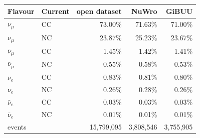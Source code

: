 \begin{tabular}{llrrr}
\toprule
Flavour & Current & open dataset & NuWro & GiBUU \\
\midrule
$\nu_\mu$ & CC & 73.00\% & 71.63\% & 71.00\% \\
$\nu_\mu$ & NC & 23.87\% & 25.23\% & 23.67\% \\
$\bar\nu_\mu$ & CC & 1.45\% & 1.42\% & 1.41\% \\
$\bar\nu_\mu$ & NC & 0.55\% & 0.58\% & 0.53\% \\
$\nu_e$ & CC & 0.83\% & 0.81\% & 0.80\% \\
$\nu_e$ & NC & 0.26\% & 0.28\% & 0.26\% \\
$\bar\nu_e$ & CC & 0.03\% & 0.03\% & 0.03\% \\
$\bar\nu_e$ & NC & 0.01\% & 0.01\% & 0.01\% \\
\midrule
events & & 15{,}799{,}095 & 3{,}808{,}546 & 3{,}755{,}905 \\
\bottomrule
\end{tabular}
